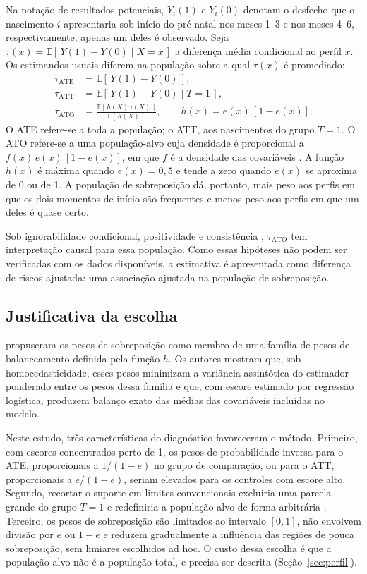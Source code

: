 \documentclass[11pt,a4paper]{article}
\newcommand{\E}{\mathbb{E}}
\newcommand{\ATO}{\mathrm{ATO}}
\begin{document}
Na notação de resultados potenciais, $Y_i(1)$ e $Y_i(0)$ denotam o desfecho que o
nascimento $i$ apresentaria sob início do pré-natal nos meses 1--3 e nos meses 4--6,
respectivamente; apenas um deles é observado. Seja
$\tau(x) = \E[\,Y(1) - Y(0) \mid X = x\,]$ a diferença média condicional ao perfil $x$. Os
estimandos usuais diferem na população sobre a qual $\tau(x)$ é promediado:
\begin{align}
\tau_{\mathrm{ATE}} &= \E\left[\,Y(1) - Y(0)\,\right], \label{eq:ate}\\
\tau_{\mathrm{ATT}} &= \E\left[\,Y(1) - Y(0) \mid T = 1\,\right], \label{eq:att}\\
\tau_{\ATO} &= \frac{\E\left[\,h(X)\,\tau(X)\,\right]}{\E\left[\,h(X)\,\right]},
  \qquad h(x) = e(x)\,\left[1 - e(x)\right]. \label{eq:ato}
\end{align}
O ATE refere-se a toda a população; o ATT, aos nascimentos do grupo $T=1$. O ATO
refere-se a uma população-alvo cuja densidade é proporcional a $f(x)\,e(x)\,[1-e(x)]$, em
que $f$ é a densidade das covariáveis \cite{li2018}. A função $h(x)$ é máxima quando
$e(x) = 0{,}5$ e tende a zero quando $e(x)$ se aproxima de 0 ou de 1. A população de
sobreposição dá, portanto, mais peso aos perfis em que os dois momentos de início são
frequentes e menos peso aos perfis em que um deles é quase certo.

Sob ignorabilidade condicional, positividade e consistência \cite{hernan2025},
$\tau_{\ATO}$ tem interpretação causal para essa população. Como essas hipóteses não
podem ser verificadas com os dados disponíveis, a estimativa é apresentada como diferença
de riscos ajustada: uma associação ajustada na população de sobreposição.

\subsection{Justificativa da escolha}

 propuseram os pesos de sobreposição como membro de uma família de
pesos de balanceamento definida pela função $h$. Os autores mostram que, sob
homocedasticidade, esses pesos minimizam a variância assintótica do estimador ponderado
entre os pesos dessa família e que, com escore estimado por regressão logística, produzem
balanço exato das médias das covariáveis incluídas no modelo.

Neste estudo, três características do diagnóstico favoreceram o método. Primeiro, com
escores concentrados perto de 1, os pesos de probabilidade inversa para o ATE, proporcionais
a $1/(1-e)$ no grupo de comparação, ou para o ATT, proporcionais a $e/(1-e)$, seriam
elevados para os controles com escore alto. Segundo, recortar o suporte em limites
convencionais excluiria uma parcela grande do grupo $T=1$ e redefiniria a população-alvo
de forma arbitrária \cite{crump2009}. Terceiro, os pesos de sobreposição são limitados ao
intervalo $[0,1]$, não envolvem divisão por $e$ ou $1-e$ e reduzem gradualmente a
influência das regiões de pouca sobreposição, sem limiares escolhidos ad hoc. O custo
dessa escolha é que a população-alvo não é a população total, e precisa ser descrita
(Seção~\ref{sec:perfil}).
\end{document}
